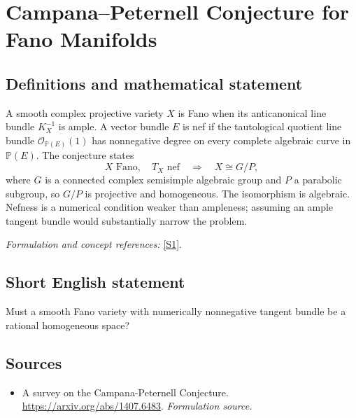 \documentclass[11pt]{article}
\begin{document}
\section*{\texorpdfstring{Campana–Peternell Conjecture for Fano Manifolds}{Campana–Peternell Conjecture for Fano Manifolds}}\label{statement}
\subsection{Definitions and mathematical statement}
A smooth complex projective variety $X$ is Fano when its anticanonical line bundle $K_X^{-1}$ is ample. A vector bundle $E$ is nef if the tautological quotient line bundle $\mathcal O_{{\mathbb{P}}(E)}(1)$ has nonnegative degree on every complete algebraic curve in ${\mathbb{P}}(E)$. The conjecture states
\[
 X\text{ Fano},\quad T_X\text{ nef}
 \quad\Longrightarrow\quad X\cong G/P,
\]
where $G$ is a connected complex semisimple algebraic group and $P$ a parabolic subgroup, so $G/P$ is projective and homogeneous. The isomorphism is algebraic. Nefness is a numerical condition weaker than ampleness; assuming an ample tangent bundle would substantially narrow the problem.
\par\smallskip\textit{Formulation and concept references:} \href{https://arxiv.org/abs/1407.6483}{[S1]}.

\subsection{Short English statement}
Must a smooth Fano variety with numerically nonnegative tangent bundle be a rational homogeneous space?
\subsection{Sources}
\begin{itemize}
\item[S1]A survey on the Campana-Peternell Conjecture.
\url{https://arxiv.org/abs/1407.6483}.
\textit{Formulation source.}
\end{itemize}
\end{document}
